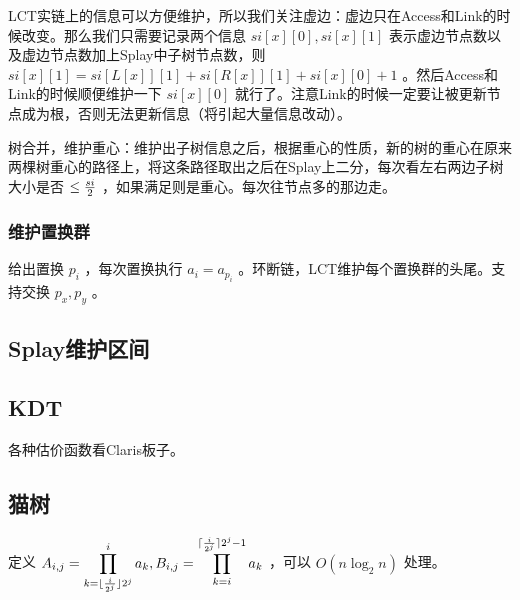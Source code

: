 LCT实链上的信息可以方便维护，所以我们关注虚边：虚边只在Access和Link的时候改变。那么我们只需要记录两个信息 $si[x][0],si[x][1]$ 表示虚边节点数以及虚边节点数加上Splay中子树节点数，则 $si[x][1]=si[L[x]][1]+si[R[x]][1]+si[x][0]+1$ 。然后Access和Link的时候顺便维护一下 $si[x][0]$ 就行了。注意Link的时候一定要让被更新节点成为根，否则无法更新信息（将引起大量信息改动）。

\vspace{0.2cm}

树合并，维护重心：维护出子树信息之后，根据重心的性质，新的树的重心在原来两棵树重心的路径上，将这条路径取出之后在Splay上二分，每次看左右两边子树大小是否 $\le {si\over 2}$ ，如果满足则是重心。每次往节点多的那边走。



\vspace{-0.3cm}

\subsubsection{维护置换群}

给出置换 $p_i$ ，每次置换执行 $a_i=a_{p_i}$ 。环断链，LCT维护每个置换群的头尾。支持交换 $p_x,p_y$ 。



\subsection{Splay维护区间}



\vspace{-0.4cm}

\subsection{KDT}

\vspace{-0.3cm}

各种估价函数看Claris板子。



\subsection{猫树}

定义 $\displaystyle A_{i,j}=\prod_{k=\lfloor{i\over 2^j}\rfloor2^j}^{i}a_k,B_{i,j}=\prod_{k=i}^{\lceil{i\over 2^j}\rceil2^j-1}a_k$ ，可以 $O(n\log_2n)$ 处理。

